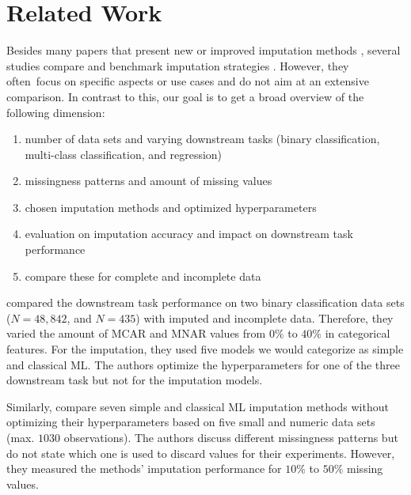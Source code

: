 \section{Related Work}
\label{sec:related_work}
Besides many papers that present new or improved imputation methods \citep{Imputation_Benchmark_4, Imputation_Benchmark_6, GAIN, VAE_for_genomic_data, HIVAE, MisGAN, VIGAN}, several studies compare and benchmark imputation strategies \citep{Imputation_Benchmark_1, Imputation_Benchmark_2, Imputation_Benchmark_3}. However, they often focus on specific aspects or use cases and do not aim at an extensive comparison. In contrast to this, our goal is to get a broad overview of the following  dimension:
%
\begin{enumerate}
	\item number of data sets and varying downstream tasks (binary classification, multi-class classification, and regression)
	\item missingness patterns and amount of missing values
	\item chosen imputation methods and optimized hyperparameters
	\item evaluation on imputation accuracy and impact on downstream task performance
	\item compare these for complete and incomplete data
\end{enumerate}

\cite{Imputation_Benchmark_3} compared the downstream task performance on two binary classification data sets ($N = 48,842$, and $N = 435$) with imputed and incomplete data. Therefore, they varied the amount of MCAR and MNAR values from $0\%$ to $40\%$ in categorical features. For the imputation, they used five models we would categorize as simple and classical ML. The authors optimize the hyperparameters for one of the three downstream task but not for the imputation models.

Similarly, \cite{Imputation_Benchmark_2} compare seven simple and classical ML imputation methods without optimizing their hyperparameters based on five small and numeric data sets (max. $1030$ observations). The authors discuss different missingness patterns but do not state which one is used to discard values for their experiments. However, they measured the methods' imputation performance for $10\%$ to $50\%$ missing values.

